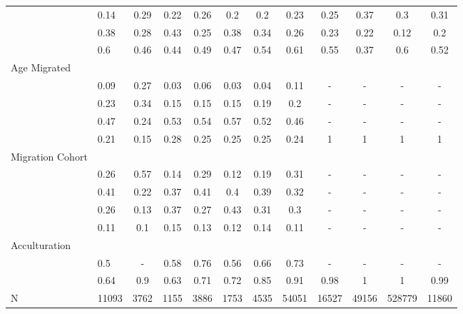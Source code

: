 \begin{table}[ht]
\begin{tabular}{>{\raggedright\arraybackslash}p{3.2cm}|lcccccc|cccc}
  \multicolumn{1}{>{\raggedleft\arraybackslash}p{2.2cm}|}{\makebox[2.2cm][r]{Lives Alone }}& 0.14 & 0.29 & 0.22 & 0.26 & 0.2 & 0.2 & 0.23 & 0.25 & 0.37 & 0.3 & 0.31 \\ 
  \multicolumn{1}{>{\raggedleft\arraybackslash}p{2.9cm}|}{\makebox[2.9cm][r]{Lives with Child }}& 0.38 & 0.28 & 0.43 & 0.25 & 0.38 & 0.34 & 0.26 & 0.23 & 0.22 & 0.12 & 0.2 \\ 
  \multicolumn{1}{>{\raggedleft\arraybackslash}p{3.4cm}|}{\makebox[3.4cm][r]{Married/Cohabiting }}& 0.6 & 0.46 & 0.44 & 0.49 & 0.47 & 0.54 & 0.61 & 0.55 & 0.37 & 0.6 & 0.52 \\ 
  Age Migrated &  &  &  &  &  &  &  &  &  &  &  \\ 
  \multicolumn{1}{>{\raggedleft\arraybackslash}p{2.4cm}|}{\makebox[2.4cm][r]{Less than 15 }}& 0.09 & 0.27 & 0.03 & 0.06 & 0.03 & 0.04 & 0.11 & - & - & - & - \\ 
  \multicolumn{1}{>{\raggedleft\arraybackslash}p{1.6cm}|}{\makebox[1.6cm][r]{15 - 23 }}& 0.23 & 0.34 & 0.15 & 0.15 & 0.15 & 0.19 & 0.2 & - & - & - & - \\ 
  \multicolumn{1}{>{\raggedleft\arraybackslash}p{1.6cm}|}{\makebox[1.6cm][r]{24 - 49 }}& 0.47 & 0.24 & 0.53 & 0.54 & 0.57 & 0.52 & 0.46 & - & - & - & - \\ 
  \multicolumn{1}{>{\raggedleft\arraybackslash}p{2.6cm}|}{\makebox[2.6cm][r]{50 and Above }}& 0.21 & 0.15 & 0.28 & 0.25 & 0.25 & 0.25 & 0.24 & 1 & 1 & 1 & 1 \\ 
  Migration Cohort &  &  &  &  &  &  &  &  &  &  &  \\ 
  \multicolumn{1}{>{\raggedleft\arraybackslash}p{2.3cm}|}{\makebox[2.3cm][r]{Before 1965 }}& 0.26 & 0.57 & 0.14 & 0.29 & 0.12 & 0.19 & 0.31 & - & - & - & - \\ 
  \multicolumn{1}{>{\raggedleft\arraybackslash}p{2.2cm}|}{\makebox[2.2cm][r]{1965 - 1979 }}& 0.41 & 0.22 & 0.37 & 0.41 & 0.4 & 0.39 & 0.32 & - & - & - & - \\ 
  \multicolumn{1}{>{\raggedleft\arraybackslash}p{2.2cm}|}{\makebox[2.2cm][r]{1980 - 1999 }}& 0.26 & 0.13 & 0.37 & 0.27 & 0.43 & 0.31 & 0.3 & - & - & - & - \\ 
  \multicolumn{1}{>{\raggedleft\arraybackslash}p{2.1cm}|}{\makebox[2.1cm][r]{After 1999 }}& 0.11 & 0.1 & 0.15 & 0.13 & 0.12 & 0.14 & 0.11 & - & - & - & - \\ 
  Acculturation &  &  &  &  &  &  &  &  &  &  &  \\ 
  \multicolumn{1}{>{\raggedleft\arraybackslash}p{1.6cm}|}{\makebox[1.6cm][r]{Citizen }}& 0.5 & - & 0.58 & 0.76 & 0.56 & 0.66 & 0.73 & - & - & - & - \\ 
  \multicolumn{1}{>{\raggedleft\arraybackslash}p{3cm}|}{\makebox[3cm][r]{English Speakers }}& 0.64 & 0.9 & 0.63 & 0.71 & 0.72 & 0.85 & 0.91 & 0.98 & 1 & 1 & 0.99 \\ 
  N & 11093 & 3762 & 1155 & 3886 & 1753 & 4535 & 54051 & 16527 & 49156 & 528779 & 11860 \\ 
   \hline
\end{tabular}
\endgroup
\end{table}
